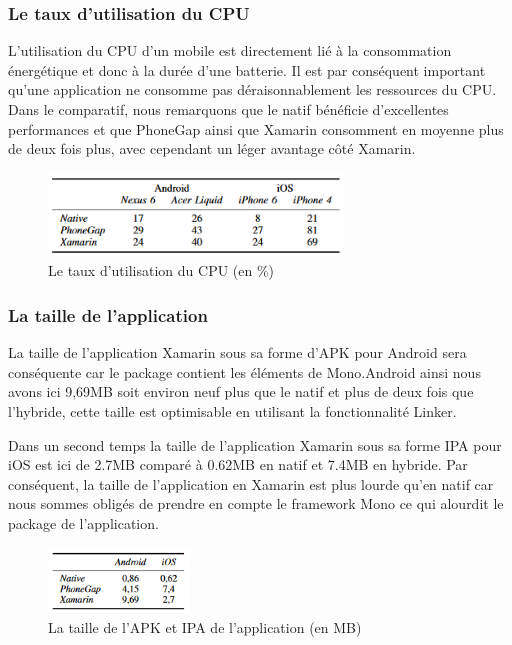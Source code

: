 \documentclass[11]{article}
\begin{document}
 \vspace{0.5cm}
  \vspace{0.5cm}

 
      \subsubsection{Le taux d’utilisation du CPU}
   
L’utilisation du CPU d’un mobile est directement lié à la consommation énergétique et donc à la durée d’une batterie. Il est par conséquent important qu’une application ne consomme pas déraisonnablement les ressources du CPU. Dans le comparatif, nous remarquons que le natif bénéficie d’excellentes performances et que PhoneGap ainsi que Xamarin consomment en moyenne plus de deux fois plus, avec cependant un léger avantage côté Xamarin.

 \begin{figure}[h]
    \centering
    \includegraphics[width=0.7\textwidth]{a4}
    \caption{Le taux d’utilisation du CPU (en \%)}
    \label{bat}
\end{figure}
 
 \subsubsection{La taille de l’application}
   
La taille de l’application Xamarin sous sa forme d’APK pour Android sera conséquente car le package contient les éléments de Mono.Android ainsi nous avons ici 9,69MB soit environ neuf plus que le natif et plus de deux fois que l’hybride, cette taille est optimisable en utilisant la fonctionnalité Linker.

 \vspace{0.5cm}

Dans un second temps la taille de l'application Xamarin sous sa forme IPA pour iOS est ici de 2.7MB comparé à 0.62MB en natif et 7.4MB en hybride. Par conséquent, la taille de l’application en Xamarin est plus lourde qu’en natif car nous sommes obligés de prendre en compte le framework Mono ce qui alourdit le package de l’application.



 \begin{figure}[h]
    \centering
    \includegraphics[width=0.334\textwidth]{a6}
    \caption{La taille de l’APK et IPA de l’application (en MB)}
    \label{bat}
\end{figure}
 
\end{document}
